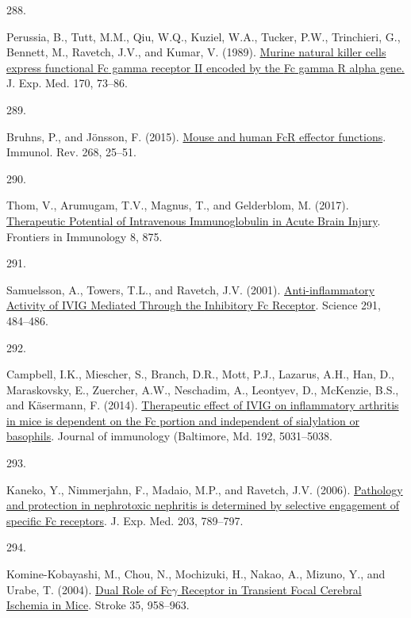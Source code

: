 \documentclass[
]{article}
\newlength{\cslhangindent}
\newlength{\csllabelwidth}
\newlength{\cslentryspacingunit} %
\newenvironment{CSLReferences}[2] %
 {%
  \setlength{\parindent}{0pt}
  \ifodd #1
  \let\oldpar\par
  \def\par{\hangindent=\cslhangindent\oldpar}
  \fi
  \setlength{\parskip}{#2\cslentryspacingunit}
 }%
 {}
\newcommand{\CSLLeftMargin}[1]{\parbox[t]{\csllabelwidth}{#1}}
\newcommand{\CSLRightInline}[1]{\parbox[t]{\linewidth - \csllabelwidth}{#1}\break}
\begin{document}
\begin{CSLReferences}{0}{0}
\leavevmode{}%
\CSLLeftMargin{288. }
\CSLRightInline{Perussia, B., Tutt, M.M., Qiu, W.Q., Kuziel, W.A., Tucker, P.W., Trinchieri, G., Bennett, M., Ravetch, J.V., and Kumar, V. (1989). \href{https://doi.org/10.1084/jem.170.1.73}{Murine natural killer cells express functional {Fc} gamma receptor {II} encoded by the {Fc} gamma {R} alpha gene.} J. Exp. Med. 170, 73--86.}

\leavevmode{}%
\CSLLeftMargin{289. }
\CSLRightInline{Bruhns, P., and Jönsson, F. (2015). \href{https://doi.org/10.1111/imr.12350}{Mouse and human {FcR} effector functions}. Immunol. Rev. 268, 25--51.}

\leavevmode{}%
\CSLLeftMargin{290. }
\CSLRightInline{Thom, V., Arumugam, T.V., Magnus, T., and Gelderblom, M. (2017). \href{https://doi.org/10.3389/fimmu.2017.00875}{Therapeutic {Potential} of {Intravenous Immunoglobulin} in {Acute Brain Injury}}. Frontiers in Immunology 8, 875.}

\leavevmode{}%
\CSLLeftMargin{291. }
\CSLRightInline{Samuelsson, A., Towers, T.L., and Ravetch, J.V. (2001). \href{https://doi.org/10.1126/science.291.5503.484}{Anti-inflammatory {Activity} of {IVIG Mediated Through} the {Inhibitory Fc Receptor}}. Science 291, 484--486.}

\leavevmode{}%
\CSLLeftMargin{292. }
\CSLRightInline{Campbell, I.K., Miescher, S., Branch, D.R., Mott, P.J., Lazarus, A.H., Han, D., Maraskovsky, E., Zuercher, A.W., Neschadim, A., Leontyev, D., McKenzie, B.S., and Käsermann, F. (2014). \href{https://doi.org/10.4049/jimmunol.1301611}{Therapeutic effect of {IVIG} on inflammatory arthritis in mice is dependent on the {Fc} portion and independent of sialylation or basophils}. Journal of immunology (Baltimore, Md. 192, 5031--5038.}

\leavevmode{}%
\CSLLeftMargin{293. }
\CSLRightInline{Kaneko, Y., Nimmerjahn, F., Madaio, M.P., and Ravetch, J.V. (2006). \href{https://doi.org/10.1084/jem.20051900}{Pathology and protection in nephrotoxic nephritis is determined by selective engagement of specific {Fc} receptors}. J. Exp. Med. 203, 789--797.}

\leavevmode{}%
\CSLLeftMargin{294. }
\CSLRightInline{Komine-Kobayashi, M., Chou, N., Mochizuki, H., Nakao, A., Mizuno, Y., and Urabe, T. (2004). \href{https://doi.org/10.1161/01.STR.0000120321.30916.8E}{Dual {Role} of {Fc\(\gamma\) Receptor} in {Transient Focal Cerebral Ischemia} in {Mice}}. Stroke 35, 958--963.}


\end{CSLReferences}
\end{document}
